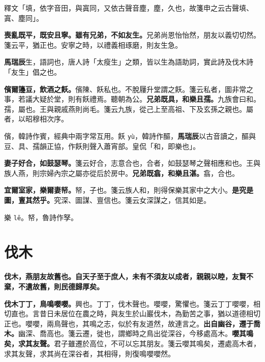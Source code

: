 \begin{quoting}釋文「填，依字音田，與寘同，又依古聲音塵，塵，久也，故箋申之云古聲填、寘、塵同」。\end{quoting}

\textbf{喪亂既平，既安且寧。雖有兄弟，不如友生。}{\footnotesize 兄弟尚恩怡怡然，朋友以義切切然。箋云平，猶正也。安寧之時，以禮義相琢磨，則友生急。}

\begin{quoting}\textbf{馬瑞辰}生，語詞也，唐人詩「太瘦生」之類，皆以生為語助詞，實此詩及伐木詩「友生」倡之也。\end{quoting}

\textbf{儐爾籩豆，飲酒之飫。}{\footnotesize 儐陳、飫私也。不脫屨升堂謂之飫。箋云私者，圖非常之事，若議大疑於堂，則有飫禮焉。聽朝為公。}\textbf{兄弟既具，和樂且孺。}{\footnotesize 九族會曰和。孺，屬也。王與親戚燕則尚毛。箋云九族，從己上至高祖、下及玄孫之親也。屬者，以昭穆相次序。}

\begin{quoting}儐，韓詩作賓，經典中兩字常互用。飫 \texttt{yù}，韓詩作醧，\textbf{馬瑞辰}以古音讀之，醧與豆、具、孺韻正協，作飫則聲入蕭宵部。皇侃「和，即樂也」。\end{quoting}

\textbf{妻子好合，如鼓瑟琴。}{\footnotesize 箋云好合，志意合也，合者，如鼓瑟琴之聲相應和也。王與族人燕，則宗婦內宗之屬亦從后於房中。}\textbf{兄弟既翕，和樂且湛。}{\footnotesize 翕，合也。}

\textbf{宜爾室家，樂爾妻帑。}{\footnotesize 帑，子也。箋云族人和，則得保樂其家中之大小。}\textbf{是究是圖，亶其然乎。}{\footnotesize 究深、圖謀、亶信也。箋云女深謀之，信其如是。}

\begin{quoting}樂 \texttt{lē}。帑，魯詩作孥。\end{quoting}

\section{伐木}


\textbf{伐木，燕朋友故舊也。自天子至于庶人，未有不須友以成者，親親以睦，友賢不棄，不遺故舊，則民德歸厚矣。}

\textbf{伐木丁丁，鳥鳴嚶嚶。}{\footnotesize 興也。丁丁，伐木聲也。嚶嚶，驚懼也。箋云丁丁嚶嚶，相切直也。言昔日未居位在農之時，與友生於山巖伐木，為勤苦之事，猶以道德相切正也。嚶嚶，兩鳥聲也，其鳴之志，似於有友道然，故連言之。}\textbf{出自幽谷，遷于喬木。}{\footnotesize 幽深、喬高也。箋云遷，徙也，謂鄉時之鳥出從深谷，今移處高木。}\textbf{嚶其鳴矣，求其友聲。}{\footnotesize 君子雖遷於高位，不可以忘其朋友。箋云嚶其鳴矣，遷處高木者，求其友聲，求其尚在深谷者，其相得，則復鳴嚶嚶然。}

